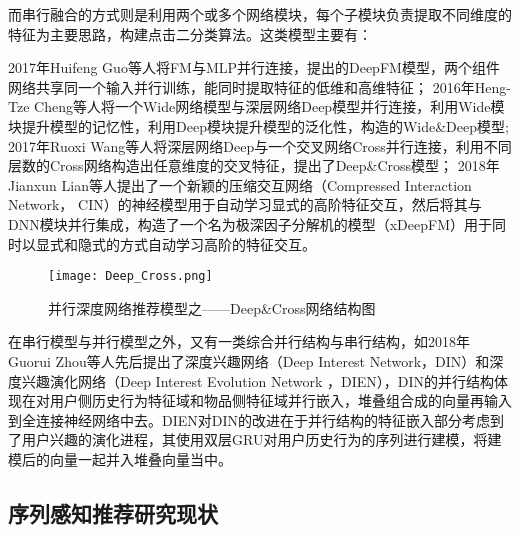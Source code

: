 而串行融合的方式则是利用两个或多个网络模块，每个子模块负责提取不同维度的特征为主要思路，构建点击二分类算法。这类模型主要有：


2017年Huifeng Guo等人将FM与MLP并行连接，提出的DeepFM模型，两个组件网络共享同一个输入并行训练，能同时提取特征的低维和高维特征；
2016年Heng-Tze Cheng等人将一个Wide网络模型与深层网络Deep模型并行连接，利用Wide模块提升模型的记忆性，利用Deep模块提升模型的泛化性，构造的Wide\&Deep模型;
2017年Ruoxi Wang等人将深层网络Deep与一个交叉网络Cross并行连接，利用不同层数的Cross网络构造出任意维度的交叉特征，提出了Deep\&Cross模型；
2018年Jianxun Lian等人提出了一个新颖的压缩交互网络（Compressed Interaction Network， CIN）的神经模型用于自动学习显式的高阶特征交互，然后将其与DNN模块并行集成，构造了一个名为极深因子分解机的模型（xDeepFM）用于同时以显式和隐式的方式自动学习高阶的特征交互。
\begin{figure}[htb]
  \centering
  \texttt{[image: Deep\_Cross.png]}\\
  \caption{并行深度网络推荐模型之——Deep\&Cross网络结构图}
  \label{fig:Deep_Cross}
\end{figure}
在串行模型与并行模型之外，又有一类综合并行结构与串行结构，如2018年Guorui Zhou等人先后提出了深度兴趣网络（Deep Interest Network，DIN）和深度兴趣演化网络（Deep Interest Evolution Network ，DIEN），DIN的并行结构体现在对用户侧历史行为特征域和物品侧特征域并行嵌入，堆叠组合成的向量再输入到全连接神经网络中去。DIEN对DIN的改进在于并行结构的特征嵌入部分考虑到了用户兴趣的演化进程，其使用双层GRU对用户历史行为的序列进行建模，将建模后的向量一起并入堆叠向量当中。

\subsection{序列感知推荐研究现状}

